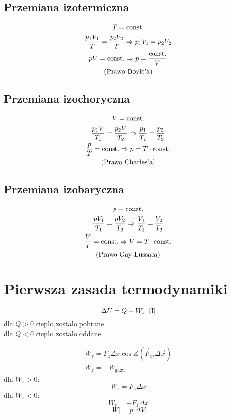 \subsection{Przemiana izotermiczna}
\begin{gather*}
  T = \operatorname{const.}\\
  \frac{p_1 V_1}{T} = \frac{p_2 V_2}{T} \Rightarrow p_1 V_1 = p_2 V_2\\
  pV = \operatorname{const.} \Rightarrow p = \frac{\operatorname{const.}}{V}\\ \text{(Prawo Boyle'a)}
\end{gather*}

\subsection{Przemiana izochoryczna}
\begin{gather*}
  V = \operatorname{const.}\\
  \frac{p_1 V}{T_1} = \frac{p_2 V}{T_2} \Rightarrow \frac{p_1}{T_1} = \frac{p_2}{T_2}\\
  \frac p T = \operatorname{const.} \Rightarrow p = T \cdot \operatorname{const.}\\ \text{(Prawo Charles'a)}
\end{gather*}

\subsection{Przemiana izobaryczna}
\begin{gather*}
  p = \operatorname{const.}\\
  \frac{p V_1}{T_1} = \frac{p V_2}{T_2} \Rightarrow \frac{V_1}{T_1} = \frac{V_2}{T_2}\\
  \frac V T = \operatorname{const.} \Rightarrow V = T \cdot \operatorname{const.}\\ \text{(Prawo Gay-Lussaca)}
\end{gather*}

\section{Pierwsza zasada termodynamiki}
\begin{equation}
  \Delta U = Q + W_z \;\left[\mathrm{J}\right]
\end{equation}
dla $Q > 0$ ciepło zostało pobrane\\
dla $Q < 0$ ciepło zostało oddane

\begin{gather*}
  W_z = F_z \Delta x \cos\measuredangle(\vec F_z, \Delta \vec x)\\
  W_z = -W_\text{gazu}
\end{gather*}
dla $W_z > 0$:
\begin{equation*}
  W_z = F_z \Delta x
\end{equation*}
dla $W_z < 0$:
\begin{equation*}
  W_z = -F_z \Delta x
\end{equation*}
\begin{equation*}
  |W| = p|\Delta V|
\end{equation*}

